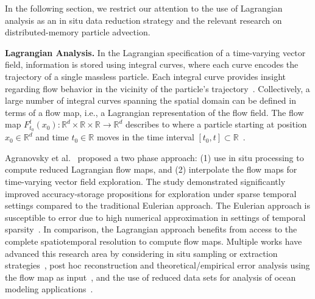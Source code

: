 In the following section, we restrict our attention to the use of Lagrangian analysis as an in situ data reduction strategy and the relevant research on distributed-memory particle advection.

\textbf{Lagrangian Analysis.}
%
In the Lagrangian specification of a time-varying vector field, information is stored using integral curves, where each curve encodes the trajectory of a single massless particle.
%
Each integral curve provides insight regarding flow behavior in the vicinity of the particle's trajectory~\cite{bujack2015lagrangian}.
%
Collectively, a large number of integral curves spanning the spatial domain can be defined in terms of a flow map, i.e., a Lagrangian representation of the flow field.
%
The flow map $F_{t_0}^{t}(x_0):\mathbb R^d \times \mathbb R \times \mathbb R  \to \mathbb R^d$ describes to where a particle starting at position $x_0\in \mathbb R^d$ and time $t_0\in \mathbb R$ moves in the time interval $[t_0,t]\subset \mathbb R$~\cite{garth2007efficient}.
%

Agranovsky et al.~\cite{agranovsky2014improved} proposed a two phase approach: (1) use in situ processing to compute reduced Lagrangian flow maps, and (2) interpolate the flow maps for time-varying vector field exploration.
%
The study demonstrated significantly improved accuracy-storage propositions for exploration under sparse temporal settings compared to the traditional Eulerian approach.
%
The Eulerian approach is susceptible to error due to high numerical approximation in settings of temporal sparsity~\cite{costa2004lagrangian,Qin2014,agranovsky2014improved,sane2018revisiting,rockwood2019practical}. 
%
In comparison, the Lagrangian approach benefits from access to the complete spatiotemporal resolution to compute flow maps.
%
Multiple works have advanced this research area by considering in situ sampling or extraction strategies~\cite{sane2019interpolation, rapp2019void}, post hoc reconstruction and theoretical/empirical error analysis using the flow map as input~\cite{hlawatsch2011hierarchical, agranovsky2015multi, bujack2015lagrangian, chandler2015interpolation, chandler2016analysis, hummel2016error, sane2018revisiting, sane2019interpolation, rapp2019void, jakob2020fluid}, and the use of reduced data sets for analysis of ocean modeling applications~\cite{envirvis.20171099}.

